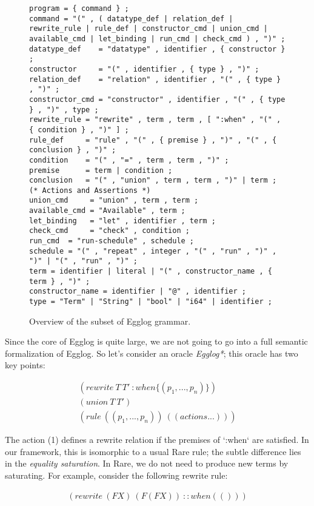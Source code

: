 \documentclass{article}
\begin{document}
\begin{figure}
\begin{lstlisting}
program = { command } ;
command = "(" , ( datatype_def | relation_def | rewrite_rule | rule_def | constructor_cmd | union_cmd | available_cmd | let_binding | run_cmd | check_cmd ) , ")" ;
datatype_def    = "datatype" , identifier , { constructor } ;
constructor     = "(" , identifier , { type } , ")" ;
relation_def    = "relation" , identifier , "(" , { type } , ")" ;
constructor_cmd = "constructor" , identifier , "(" , { type } , ")" , type ;
rewrite_rule = "rewrite" , term , term , [ ":when" , "(" , { condition } , ")" ] ;
rule_def     = "rule" , "(" , { premise } , ")" , "(" , { conclusion } , ")" ;
condition    = "(" , "=" , term , term , ")" ;
premise      = term | condition ;
conclusion   = "(" , "union" , term , term , ")" | term ;
(* Actions and Assertions *)
union_cmd     = "union" , term , term ;
available_cmd = "Available" , term ;
let_binding   = "let" , identifier , term ;
check_cmd     = "check" , condition ;
run_cmd  = "run-schedule" , schedule ;
schedule = "(" , "repeat" , integer , "(" , "run" , ")" , ")" | "(" , "run" , ")" ;
term = identifier | literal | "(" , constructor_name , { term } , ")" ;
constructor_name = identifier | "@" , identifier ;
type = "Term" | "String" | "bool" | "i64" | identifier ;
\end{lstlisting}
\caption{\label{fig:fig3} Overview of the subset of Egglog grammar.}
\end{figure}

Since the core of Egglog is quite large, we are not going to go into a full semantic formalization of Egglog. So let's consider an oracle \emph{Egglog*}; this oracle has two key points:

\begin{align}
    (rewrite\:T\:T'\: :when \{(p_{1}, ..., p_{n})\}) \\
    (union\:T\:T') \\
    (rule\:((p_{1}, ..., p_{n}))\: ((actions...)))
\end{align}

The action (1) defines a rewrite relation if the premises of `:when` are satisfied. In our framework, this is isomorphic to a usual Rare rule; the subtle difference lies in the \emph{equality saturation}. In Rare, we do not need to produce new terms by saturating. For example, consider the following rewrite rule:

\begin{align}
    (rewrite\:(F X)\:(F (F X))\ : :when (()))
\end{align}
\end{document}
